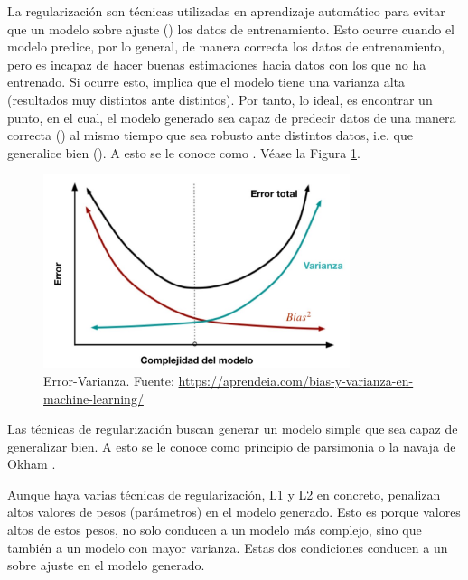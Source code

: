 La regularización son técnicas utilizadas en aprendizaje automático para evitar que un modelo sobre ajuste () los datos de entrenamiento. Esto ocurre cuando el modelo predice, por lo general, de manera correcta los datos de entrenamiento, pero es incapaz de hacer buenas estimaciones hacia datos con los que no ha entrenado. Si ocurre esto, implica que el modelo tiene una varianza alta (resultados muy distintos ante  distintos). Por tanto, lo ideal, es encontrar un punto, en el cual, el modelo generado sea capaz de predecir datos de una manera correcta () al mismo tiempo que sea robusto ante distintos datos, i.e. que generalice bien (). A esto se le conoce como . Véase la Figura \ref{bias_var}.

\begin{figure}[H]
    \centering
    \includegraphics[width = 0.8\textwidth]{imgs/bias_variance.jpg}
    \caption{Error-Varianza. \scriptsize{Fuente: \url{https://aprendeia.com/bias-y-varianza-en-machine-learning/}}}
    \label{bias_var}
\end{figure}

Las técnicas de regularización buscan generar un modelo simple que sea capaz de generalizar bien. A esto se le conoce como principio de parsimonia o la navaja de Okham \parencite{occam}. 

Aunque haya varias técnicas de regularización, L1 y L2 en concreto, penalizan altos valores de pesos (parámetros) en el modelo generado. Esto es porque valores altos de estos pesos, no solo conducen a un modelo más complejo, sino que también a un modelo con mayor varianza\fnm. Estas dos condiciones conducen a un sobre ajuste en el modelo generado. 

